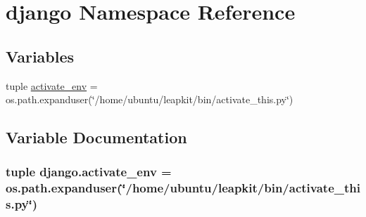 \hypertarget{namespacedjango}{\section{django Namespace Reference}
\label{namespacedjango}
}
\subsection*{Variables}
\begin{DoxyCompactItemize}
\item 
tuple \hyperlink{namespacedjango_ab5c0776feda2fdf1d6a08f0345dfb8c4}{activate\-\_\-env} = os.\-path.\-expanduser(\char`\"{}/home/ubuntu/leapkit/bin/activate\-\_\-this.\-py\char`\"{})
\end{DoxyCompactItemize}


\subsection{Variable Documentation}
\hypertarget{namespacedjango_ab5c0776feda2fdf1d6a08f0345dfb8c4}{
\subsubsection[{activate\-\_\-env}]{\setlength{\rightskip}{0pt plus 5cm}tuple django.\-activate\-\_\-env = os.\-path.\-expanduser(\char`\"{}/home/ubuntu/leapkit/bin/activate\-\_\-this.\-py\char`\"{})}}\label{namespacedjango_ab5c0776feda2fdf1d6a08f0345dfb8c4}
